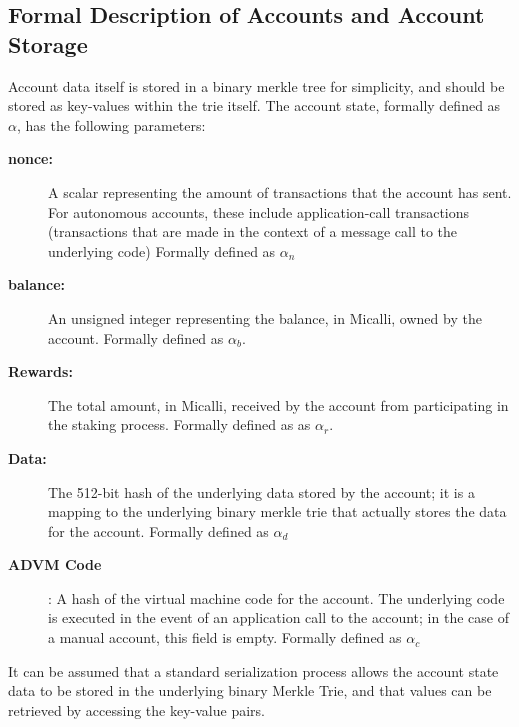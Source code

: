 \documentclass[conference]{IEEEtran}
\begin{document}
\subsection {Formal Description of Accounts and Account Storage}
 Account data itself is stored in a binary merkle tree for simplicity, and should be stored as key-values within the trie itself. The account state, formally defined as $\alpha$, has the following parameters:
 
 \begin{description}
\item[\textbf{nonce:}]\hspace{3}  A scalar representing the amount of transactions that the account has sent. For autonomous accounts, these include application-call transactions (transactions that are made in the context of a message call to the underlying code) Formally defined as $\alpha_n$
\item[\textbf{balance:}]\hspace{10}  An unsigned integer representing the balance, in Micalli, owned by the account. Formally defined as $\alpha_b$.
\item[\textbf{Rewards:}]\hspace{10}  The total amount, in Micalli, received by the account from participating in the staking process. Formally defined as as $\alpha_r$.
\item[\textbf{Data:}] The 512-bit hash of the underlying data stored by the account; it is a mapping to the underlying binary merkle trie that actually stores the data for the account. Formally defined as $\alpha_d$
\item[\textbf{ADVM Code}]\hspace{30}: A hash of the virtual machine code for the account. The underlying code is executed in the event of an application call to the account; in the case of a manual account, this field is empty. Formally defined as $\alpha_c$ 
\end{description}

It can be assumed that a standard serialization process allows the account state data to be stored in the underlying binary Merkle Trie, and that values can be retrieved by accessing the key-value pairs. 





 
\end{document}
